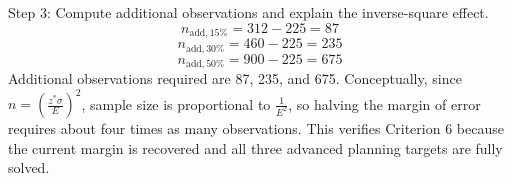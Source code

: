\begin{ExamProblems}
		Step 3: Compute additional observations and explain the inverse-square effect.
		\[
		n_{\text{add},15\%} = 312 - 225 = 87
		\]
		\[
		n_{\text{add},30\%} = 460 - 225 = 235
		\]
		\[
		n_{\text{add},50\%} = 900 - 225 = 675
		\]
		Additional observations required are 87, 235, and 675. Conceptually, since $n = \left(\frac{z^*\sigma}{E}\right)^2$, sample size is proportional to $\frac{1}{E^2}$, so halving the margin of error requires about four times as many observations. This verifies Criterion 6 because the current margin is recovered and all three advanced planning targets are fully solved.

	\end{ExamProblems}

